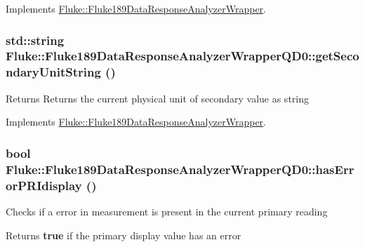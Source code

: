 Implements \hyperlink{classFluke_1_1Fluke189DataResponseAnalyzerWrapper_a54f606e7d645b34c075074d72b291ce8}{Fluke::Fluke189DataResponseAnalyzerWrapper}.\hypertarget{classFluke_1_1Fluke189DataResponseAnalyzerWrapperQD0_af504a28abc1a4a92a26daf1ccf79150f}{
\subsubsection[{getSecondaryUnitString}]{\setlength{\rightskip}{0pt plus 5cm}std::string Fluke::Fluke189DataResponseAnalyzerWrapperQD0::getSecondaryUnitString ()}}
\label{classFluke_1_1Fluke189DataResponseAnalyzerWrapperQD0_af504a28abc1a4a92a26daf1ccf79150f}
\begin{DoxyReturn}{Returns}
Returns the current physical unit of secondary value as string 
\end{DoxyReturn}


Implements \hyperlink{classFluke_1_1Fluke189DataResponseAnalyzerWrapper_ae8fa175a376f000e0ccebef46b0f6cc2}{Fluke::Fluke189DataResponseAnalyzerWrapper}.\hypertarget{classFluke_1_1Fluke189DataResponseAnalyzerWrapperQD0_a173f4602b71d7d415e11aa1f1826d3f0}{
\subsubsection[{hasErrorPRIdisplay}]{\setlength{\rightskip}{0pt plus 5cm}bool Fluke::Fluke189DataResponseAnalyzerWrapperQD0::hasErrorPRIdisplay ()}}
\label{classFluke_1_1Fluke189DataResponseAnalyzerWrapperQD0_a173f4602b71d7d415e11aa1f1826d3f0}
Checks if a error in measurement is present in the current primary reading \begin{DoxyReturn}{Returns}
{\bfseries true} if the primary display value has an error 
\end{DoxyReturn}


